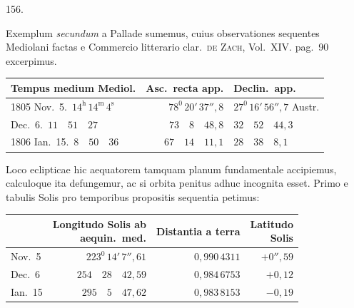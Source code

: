 \par{}\medskip
\hypertarget{native-211-article156}{}
\begin{center}156.\end{center}
Exemplum \textit{secundum} a Pallade sumemus, cuius observationes sequentes Mediolani factas e Commercio litterario clar.\ \textsc{de Zach}, Vol.\ XIV. pag.\ 90 excerpimus.
\begin{center}
\begingroup\footnotesize\setlength{\tabcolsep}{4pt}\renewcommand{\arraystretch}{1.2}
\begin{tabular}{|l|r|l|}\hline
Tempus medium Mediol. & Asc.\ recta app. & Declin.\ app.\\\hline
1805 Nov.\ 5.\ $14^{\mathrm h}\,14^{\mathrm m}\,4^{\mathrm s}$ & $78^{0}\,20'\,37''{,}8$ & $27^{0}\,16'\,56''{,}7$ Austr.\\
\hspace{2.4em}Dec.\ 6.\ $11\quad51\quad27$ & $73\quad8\quad48{,}8$ & $32\quad52\quad44{,}3$\\
1806 Ian.\ 15.\ $8\quad50\quad36$ & $67\quad14\quad11{,}1$ & $28\quad38\quad8{,}1$\\\hline
\end{tabular}\endgroup
\end{center}

Loco eclipticae hic aequatorem tamquam planum fundamentale accipiemus, calculoque ita defungemur, ac si orbita penitus adhuc incognita esset. Primo e tabulis Solis pro temporibus propositis sequentia petimus:
\begin{center}
\begingroup\footnotesize\setlength{\tabcolsep}{4pt}\renewcommand{\arraystretch}{1.2}
\begin{tabular}{|l|r|r|r|}\hline
& \shortstack{Longitudo Solis ab\\aequin.\ med.} & Distantia a terra & \shortstack{Latitudo\\Solis}\\\hline
Nov.\ 5 & $223^{0}\,14'\,7''{,}61$ & $0{,}990\,4311$ & $+0''{,}59$\\
Dec.\ 6 & $254\quad28\quad42{,}59$ & $0{,}984\,6753$ & $+0{,}12$\\
Ian.\ 15 & $295\quad5\quad47{,}62$ & $0{,}983\,8153$ & $-0{,}19$\\\hline
\end{tabular}\endgroup
\end{center}

